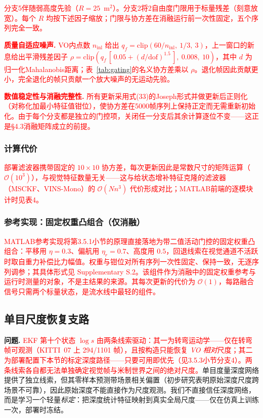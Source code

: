 \textcolor{red}{分支5伴随弱高度先验（$R = 25$~m$^2$）。分支2将2自由度门限用于标量残差（刻意放宽）。每个 $R$ 均按下述因子缩放；门限与协方差在消融运行前一次性固定，五个序列完全一致。}

\textcolor{red}{\textbf{质量自适应噪声.} VO内点数 $n_{\mathrm{inl}}$ 给出 $q_f = \mathrm{clip}(60/n_{\mathrm{inl}},\ 1/3,\ 3)$，上一窗口的新息给出平滑残差因子 $\rho = \mathrm{clip}\!\left(q_f\,[\,0.05 + (d/\mathrm{dof})^{1.5}\,],\ 0.008,\ 10\right)$，其中 $d$ 为归一化Mahalanobis距离；表~\ref{tab:gating}的名义协方差乘以 $\rho$。退化帧因此贡献更小，完全退化的帧只贡献一个放大噪声的无运动先验。}

\textcolor{red}{\textbf{数值稳定性与消融完整性.} 所有更新采用式(33)的Joseph形式并做更新后正则化（对称化加最小特征值钳位），使协方差在5000帧序列上保持正定而无需重新初始化。由于每个分支都是独立的门控项，关闭任一分支后其余计算逐位不变——这正是§4.3消融矩阵成立的前提。}

\subsubsection{计算代价}

\textcolor{red}{部署滤波器携带固定的 $10 \times 10$ 协方差，每次更新因此是常数尺寸的矩阵运算（$\mathcal{O}(10^3)$），与视觉特征数量无关——这与给状态增补特征克隆的滤波器（MSCKF、VINS-Mono）的 $\mathcal{O}(N n^3)$ 代价形成对比；MATLAB前端的逐模块计时见表4。}

\subsubsection{参考实现：固定权重凸组合（仅消融）}

\textcolor{red}{MATLAB参考实现将第3.5.1小节的原理直接落地为带二值活动门控的固定权重凸组合：平移用 $\eta = 0.3$、偏航用 $\eta_r = 0.7$、高度用 $0.5$，回退线索在视觉通道不活跃时取自重力补偿比力幅值。权重与钳位对所有序列一次性固定、保持一致，无逐序列调参；其具体形式见 Supplementary S.2。该组件作为消融中的固定权重参考与运行时测量的对象，不是主结果的来源。其每次更新的代价为 $\mathcal{O}(1)$，每路融合信号只需两个标量状态，是流水线中最轻的组件。}

\subsection{单目尺度恢复支路}
\label{sec:scale_recovery}

\textbf{问题.} \textcolor{red}{EKF 第十个状态 $\log s$ 由两条线索驱动：其一为转弯运动学——仅在转弯帧可观测（KITTI~07 上 294/1101 帧），且按构造只能恢复 \emph{VO 相对}尺度；其二为部署配置下本节的标定深度路径——只要可用即优先（见3.5.3小节分支4）。两条线索各自都无法单独确定视觉帧与米制世界之间的绝对尺度。}单目度量深度网络提供了独立线索，但其零样本预测带场景相关偏置（初步研究表明原始深度尺度跨场景不可靠），因此原始深度不能直接作为尺度观测。我们不直接信任深度网络，而是学习一个轻量\emph{标定}：把深度统计特征映射到真实全局尺度——仅在仿真上训练一次，部署时冻结。


